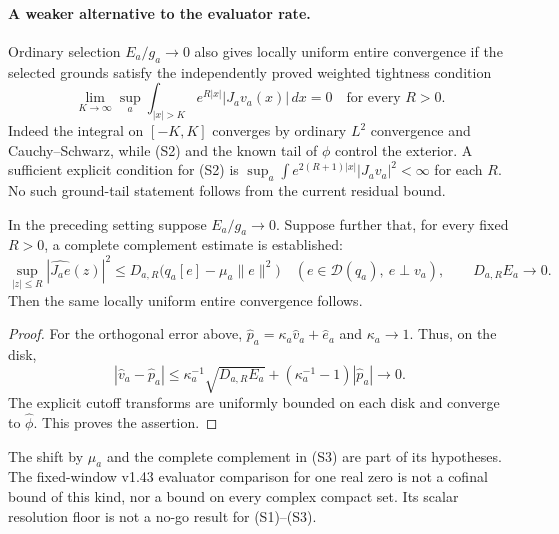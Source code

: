 \paragraph{A weaker alternative to the evaluator rate.}
Ordinary selection $E_a/g_a\to0$ also gives locally uniform entire
convergence if the selected grounds satisfy the independently proved
weighted tightness condition
\[
 \lim_{K\to\infty}\sup_a\int_{|x|>K}e^{R|x|}|J_av_a(x)|\,dx=0
 \quad\text{for every }R>0. \tag{S2}
\]
Indeed the integral on $[-K,K]$ converges by ordinary $L^2$ convergence
and Cauchy--Schwarz, while (S2) and the known tail of $\phi$ control
the exterior. A sufficient explicit condition for (S2) is
$\sup_a\int e^{2(R+1)|x|}|J_av_a|^2<\infty$ for each $R$.
No such ground-tail statement follows from the current residual bound.

\begin{proposition}
\label{prop:ns43-ccm-evaluator-selection}
In the preceding setting suppose $E_a/g_a\to0$. Suppose further that,
for every fixed $R>0$, a complete complement estimate is established:
\[
 \sup_{|z|\le R}|\widehat{J_ae}(z)|^2
 \le D_{a,R}\bigl(q_a[e]-\mu_a\|e\|^2\bigr)
 \quad(e\in\mathcal D(q_a),\ e\perp v_a),
 \qquad D_{a,R}E_a\to0. \tag{S3}
\]
Then the same locally uniform entire convergence follows.
\end{proposition}
\begin{proof}
For the orthogonal error above,
$\widehat p_a=\kappa_a\widehat v_a+\widehat e_a$ and
$\kappa_a\to1$. Thus, on the disk,
\[
 |\widehat v_a-\widehat p_a|
 \le \kappa_a^{-1}\sqrt{D_{a,R}E_a}
       +(\kappa_a^{-1}-1)|\widehat p_a|\to0.
\]
The explicit cutoff transforms are uniformly bounded on each disk
and converge to $\widehat\phi$. This proves the assertion.
\end{proof}
The shift by $\mu_a$ and the complete complement in (S3) are part of
its hypotheses. The fixed-window v1.43 evaluator comparison for one
real zero is not a cofinal bound of this kind, nor a bound on every
complex compact set. Its scalar resolution floor is not a no-go
result for (S1)--(S3).

